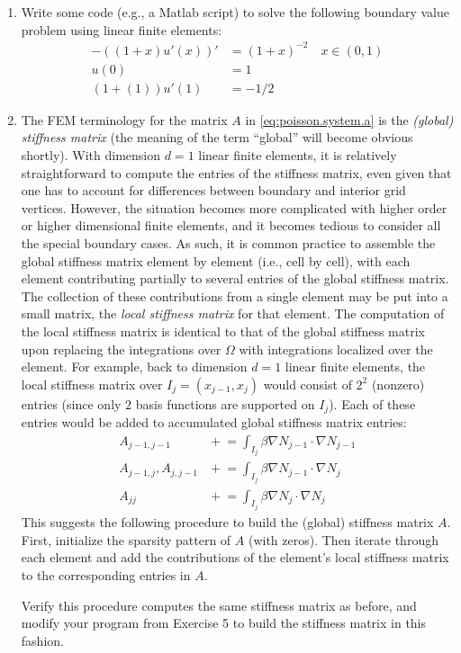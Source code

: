 \begin{enumerate}
\item Write some code (e.g., a Matlab script) to solve the following boundary value problem using linear finite elements:
\begin{align*}
-\left( \left( 1 + x \right) u'(x) \right)' & = \left( 1 + x \right)^{-2} \quad x \in (0, 1) \\
u(0) & = 1 \\
\left( 1 + (1) \right) u'(1) & = -1/2
\end{align*}

\item The FEM terminology for the matrix $A$ in \eqref{eq:poisson.system.a} is the \emph{(global) stiffness matrix} (the meaning of the term ``global'' will become obvious shortly). With dimension $d = 1$ linear finite elements, it is relatively straightforward to compute the entries of the stiffness matrix, even given that one has to account for differences between boundary and interior grid vertices. However, the situation becomes more complicated with higher order or higher dimensional finite elements, and it becomes tedious to consider all the special boundary cases. As such, it is common practice to assemble the global stiffness matrix element by element (i.e., cell by cell), with each element contributing partially to several entries of the global stiffness matrix. The collection of these contributions from a single element may be put into a small matrix, the \emph{local stiffness matrix} for that element. The computation of the local stiffness matrix is identical to that of the global stiffness matrix upon replacing the integrations over $\Omega$ with integrations localized over the element. For example, back to dimension $d = 1$ linear finite elements, the local stiffness matrix over $I_j = \left( x_{j-1}, x_j \right)$ would consist of $2^2$ (nonzero) entries (since only $2$ basis functions are supported on $I_j$). Each of these entries would be added to accumulated global stiffness matrix entries:
\begin{align*}
A_{j-1,j-1}          & {} +\!\!= \int_{I_j} \beta \nabla N_{j-1} \cdot \nabla N_{j-1} \\
A_{j-1,j}, A_{j,j-1} & {} +\!\!= \int_{I_j} \beta \nabla N_{j-1} \cdot \nabla N_j \\
A_{jj}               & {} +\!\!= \int_{I_j} \beta \nabla N_j \cdot \nabla N_j
\end{align*}
This suggests the following procedure to build the (global) stiffness matrix $A$. First, initialize the sparsity pattern of $A$ (with zeros). Then iterate through each element and add the contributions of the element's local stiffness matrix to the corresponding entries in $A$.

Verify this procedure computes the same stiffness matrix as before, and modify your program from Exercise 5 to build the stiffness matrix in this fashion.

\end{enumerate}

